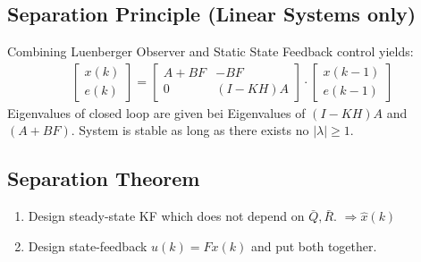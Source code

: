 \documentclass[landscape,a4paper,8pt]{scrartcl}
\begin{document}
\begin{multicols*}{3}


\subsection{Separation Principle (Linear Systems only)}
Combining Luenberger Observer and Static State Feedback control yields:
\begin{align*}
\begin{bmatrix}
x(k) \\ e(k) 
\end{bmatrix}
= 
\begin{bmatrix}
A + BF & - B F \\ 0 & (I-KH) A
\end{bmatrix}
\cdot
\begin{bmatrix}
x(k-1) \\ e(k-1)
\end{bmatrix}
\end{align*}
Eigenvalues of closed loop are given bei Eigenvalues of $(I-KH) A$ and $(A + BF)$. System is stable as long as there exists no $|\lambda| \geq 1$. \\



\subsection{Separation Theorem}

\begin{enumerate}
\item Design steady-state KF which does not depend on $\bar{Q}, \bar{R}$. $\Rightarrow \hat{x}(k)$
\item Design state-feedback $u(k) = F x(k)$ and put both together.
\end{enumerate}

\end{multicols*}
\end{document}
